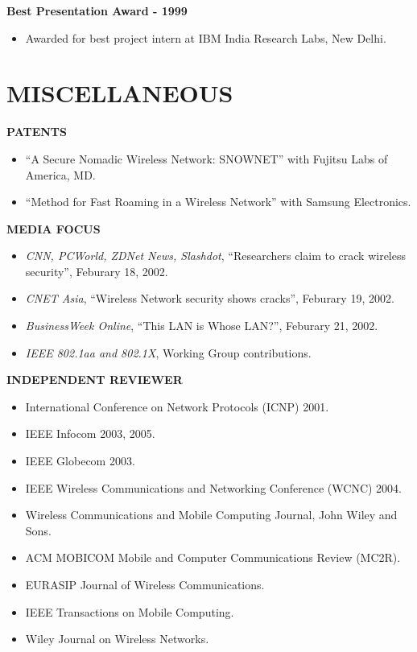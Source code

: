 \begin{resume}
{\bf Best Presentation Award - 1999}
    \begin{itemize}
         \item[] Awarded for best project intern at IBM India Research Labs, New Delhi. 
    \end{itemize}

\section{MISCELLANEOUS}
\vspace{0.1in}

{\bf PATENTS}
    \begin{itemize}
         \item[] ``A Secure Nomadic Wireless Network: SNOWNET'' with Fujitsu Labs of America, MD.
	 \item[] ``Method for Fast Roaming in a Wireless Network'' with Samsung Electronics.
    \end{itemize}

{\bf MEDIA FOCUS}
    \begin{itemize}
         \item[] {\em CNN, PCWorld, ZDNet News, Slashdot},  ``Researchers claim to crack
           wireless security'', Feburary 18, 2002.
         \item[] {\em CNET Asia}, ``Wireless Network security shows cracks'', Feburary 19, 2002.  
         \item[] {\em BusinessWeek Online}, ``This LAN is Whose LAN?'', Feburary 21, 2002. 
	 \item[] {\em IEEE 802.1aa and 802.1X}, Working Group contributions.
    \end{itemize}

{\bf INDEPENDENT REVIEWER} 
    \begin{itemize}
         \item[]  International Conference on Network Protocols (ICNP) 2001.
         \item[]  IEEE Infocom 2003, 2005.
         \item[]  IEEE Globecom 2003.
         \item[]  IEEE Wireless Communications and Networking Conference (WCNC) 2004.
         \item[]  Wireless Communications and Mobile Computing Journal, John Wiley and Sons.
         \item[]  ACM MOBICOM Mobile and Computer Communications Review (MC2R).
	 \item[]  EURASIP Journal of Wireless Communications.
	 \item[]  IEEE Transactions on Mobile Computing.
         \item[]  Wiley Journal on Wireless Networks.
    \end{itemize}


\end{resume}
